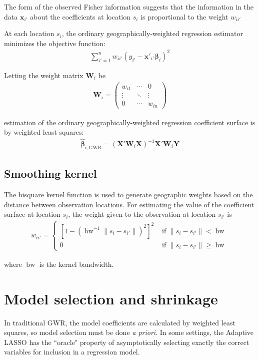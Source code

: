 \documentclass[authoryear, review, 11pt]{elsarticle}
\DeclareMathOperator*{\bw}{\mbox{bw}}
\begin{document}
	The form of the observed Fisher information suggests that the information in the data $\bm{x}_{i'}$ about the coefficients at location $s_i$ is proportional to the weight $w_{ii'}$
	
	At each location $s_i$, the ordinary geographically-weighted regression estimator minimizes the objective function:
	\begin{eqnarray}
		\sum_{i'=1}^n w_{ii'} \left(y_{i'} - \bm{x}'_{i'} \bm{\beta}_i \right)^2
	\end{eqnarray}
	
	Letting the weight matrix $\bm{W}_i$ be	
	\begin{eqnarray}
		\bm{W}_i =  \left( \begin{array}{ccc} w_{i1} & \cdots & 0 \\ \vdots & \ddots & \vdots \\ 0 & \cdots & w_{in} \end{array} \right)
	\end{eqnarray}
	
	estimation of the ordinary geographically-weighted regression coefficient surface is by weighted least squares:	
	\begin{eqnarray}
		\hat{\bm{\beta}}_{i, \mbox{GWR}} = \left( \bm{X}'\bm{W}_i\bm{X} \right)^{-1} \bm{X}'\bm{W}_i\bm{Y}
	\end{eqnarray}
	
	 
	 \subsection{Smoothing kernel}
	 	The bisquare kernel function is used to generate geographic weights based on the distance between observation locations. For estimating the value of the coefficient surface at location $s_i$, the weight given to the observation at location $s_{i'}$ is	
	\begin{eqnarray}
		w_{ii'} = \begin{cases} \left[ 1-\left( \bw^{-1} \|s_i-s_{i'}\| \right)^2 \right]^2 & \mbox{ if } \|s_i-s_{i'}\| < \bw \\ 0 & \mbox{ if } \|s_i-s_{i'}\| \geq \bw \end{cases}
	\end{eqnarray}
	
	where $\bw$ is the kernel bandwidth.\\
	
\section{Model selection and shrinkage \label{section:method}}
	In traditional GWR, the model coefficients are calculated by weighted least squares, so model selection must be done \emph{a priori}. In some settings, the Adaptive LASSO \citep{Zou:2006} has the ``oracle" property of asymptotically selecting exactly the correct variables for inclusion in a regression model.\\
\end{document}
